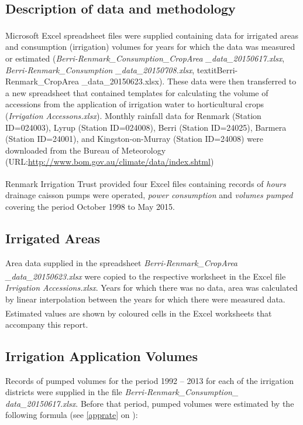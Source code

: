 \documentclass[a4paper, titlepage, 12pt]{article}\usepackage[]{graphicx}\usepackage[]{color}
\begin{document}
\begin{sffamily}
\section{Description of data and methodology}
Microsoft Excel\textsuperscript{\textregistered} spreadsheet files were supplied containing data for irrigated areas and consumption (irrigation) volumes for years for which the data was measured or estimated (\textit{Berri-Renmark\_Consumption\_CropArea \allowbreak \_data\_20150617.xlsx}, \textit{Berri-Renmark\_Consumption \allowbreak \_data\_20150708.xlsx}, textit{Berri-Renmark\_CropArea \allowbreak \_data\_20150623.xlsx}). These data were then transferred to a new spreadsheet that contained templates for calculating the volume of accessions from the application of irrigation water to horticultural crops (\textit{Irrigation Accessons.xlsx}). Monthly rainfall data for Renmark (Station ID=024003), Lyrup (Station ID=024008), Berri (Station ID=24025), Barmera (Station ID=24001), and Kingston-on-Murray (Station ID=24008) were downloaded from the Bureau of Meteorology (URL:\url{http://www.bom.gov.au/climate/data/index.shtml})

Renmark Irrigation Trust provided four Excel\textsuperscript{\textregistered} files containing records of \textit{hours} drainage caisson pumps were operated, \textit{power consumption} and \textit{volumes pumped} covering the period October 1998 to May 2015. 

\subsection{Irrigated Areas} \label{irrarea} Area data supplied in the spreadsheet \textit{Berri-Renmark\_CropArea \allowbreak \_data\_20150623.xlsx} were copied to the respective worksheet in the Excel\textsuperscript{\textregistered} file \textit{Irrigation Accessions.xlsx}. Years for which there was no data, area was calculated by linear interpolation between the years for which there were measured data. Estimated values are shown by coloured cells in the Excel\textsuperscript{\textregistered} worksheets that accompany this report. 

\subsection{Irrigation Application Volumes} \label{irrvol} Records of pumped volumes for the period 1992 -- 2013 for each of the irrigation districts were supplied in the file \textit{Berri-Renmark\_Consumption\_ \allowbreak data\_20150617.xlsx}. Before that period, pumped volumes were estimated by the following formula (see \ref{apprate} on \pageref{apprate}):
 

\end{sffamily}
\end{document}
